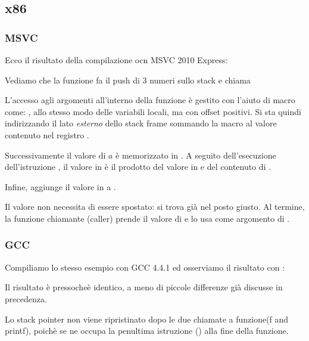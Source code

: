 \subsection{x86}

\subsubsection{MSVC}

Ecco il risultato della compilazione ocn MSVC 2010 Express:




Vediamo che la funzione \main fa il push di 3 numeri sullo stack e chiama  

L'accesso agli argomenti all'interno della funzione \ttf è gestito con l'aiuto di macro come: , 
allo stesso modo delle variabili locali, ma con offset positivi.
Si sta quindi indirizzando il lato \emph{esterno} dello \gls{stack frame} sommando la macro  al valore contenuto nel registro \EBP.


Successivamente il valore di $a$ è memorizzato in \EAX. A seguito dell'esecuzione dell'istruzione \IMUL, il valore in \EAX è 
il \gls{prodotto} del valore in \EAX e del contenuto di .

Infine, \ADD aggiunge il valore in  a \EAX.

Il valore \EAX non necessita di essere spostato: si trova già nel posto giusto.
Al termine, la funzione chiamante (\gls{caller}) prende il valore di \EAX e lo usa come argomento di \printf.



\subsubsection{GCC}

Compiliamo lo stesso esempio con GCC 4.4.1 ed osserviamo il risultato con \IDA:



Il risultato è pressocheè identico, a meno di piccole differenze già discusse in precedenza.

Lo \gls{stack pointer} non viene ripristinato dopo le due chiamate a funzione(f and printf), 
poichè se ne occupa la penultima istruzione  () alla fine della funzione.
